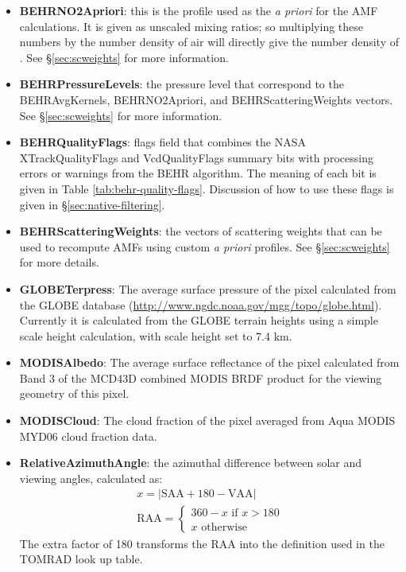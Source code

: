 \documentclass[12pt]{article}
\begin{document}
\begin{itemize}
	\item \textbf{BEHRNO2Apriori}: this is the  profile used as the \emph{a priori} for the AMF calculations. It is given as unscaled mixing ratios; so multiplying these numbers by the number density of air will directly give the number density of . See \S\ref{sec:scweights} for more information.
	
	\item \textbf{BEHRPressureLevels}: the pressure level that correspond to the BEHRAvgKernels, BEHRNO2Apriori, and BEHRScatteringWeights vectors. See \S\ref{sec:scweights} for more information.
	
	\item \textbf{BEHRQualityFlags}: flags field that combines the NASA XTrackQualityFlags and VcdQualityFlags summary bits with processing errors or warnings from the BEHR algorithm. The meaning of each bit is given in Table \ref{tab:behr-quality-flags}. Discussion of how to use these flags is given in \S\ref{sec:native-filtering}.
	
	\item \textbf{BEHRScatteringWeights}: the vectors of scattering weights that can be used to recompute AMFs using custom \emph{a priori} profiles. See \S\ref{sec:scweights} for more details.
	
	\item \textbf{GLOBETerpress}: The average surface pressure of the pixel calculated from the GLOBE database (\url{http://www.ngdc.noaa.gov/mgg/topo/globe.html}). Currently it is calculated from the GLOBE terrain heights using a simple scale height calculation, with scale height set to 7.4 km.
	
	
	\item \textbf{MODISAlbedo}: The average surface reflectance of the pixel calculated from Band 3 of the MCD43D combined MODIS BRDF product for the viewing geometry of this pixel. 
	
	\item \textbf{MODISCloud}: The cloud fraction of the pixel averaged from Aqua MODIS MYD06 cloud fraction data.
	
	\item \textbf{RelativeAzimuthAngle}: the azimuthal difference between solar and viewing angles, calculated as:
	\begin{align*}
		x = |\mathrm{SAA} + 180 - \mathrm{VAA}| \\
		\mathrm{RAA} = \left\{ 
				\begin{matrix}
					360 - x \text{ if } x > 180 \\
					x	\text{ otherwise}
				\end{matrix}
			\right.
	\end{align*}
	The extra factor of 180 transforms the RAA into the definition used in the TOMRAD look up table.
	

\end{itemize}
\end{document}
